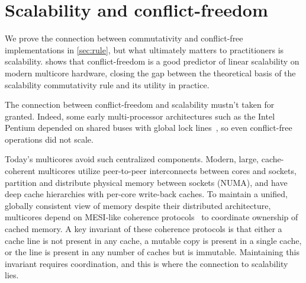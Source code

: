 \section{Scalability and conflict-freedom}
\label{sec:scalability}








We prove the connection between commutativity and conflict-free
implementations in \cref{sec:rule}, but what ultimately matters to
practitioners is scalability.   shows that
conflict-freedom is a good predictor of linear scalability on modern
multicore hardware, closing the gap between the theoretical basis of
the scalability commutativity rule and its utility in practice.

The connection between conflict-freedom and scalability mustn't taken
for granted.  Indeed, some early multi-processor architectures such as
the Intel Pentium depended on shared buses with global lock
lines~\cite[\S8.1.4]{intel-sdm-3}, so even conflict-free operations
did not scale.

Today's multicores avoid such centralized components.  Modern, large,
cache-coherent multicores utilize peer-to-peer interconnects between
cores and sockets, partition and distribute physical memory between
sockets (NUMA), and have deep cache hierarchies with per-core
write-back caches.
%
To maintain a unified, globally consistent view of memory despite
their distributed architecture, multicores depend on MESI-like
coherence protocols~\cite{papamarcos:mesi} to coordinate ownership of
cached memory.
%
A key invariant of these coherence protocols is that either a cache
line is not present in any cache, a mutable copy is present in a
single cache, or the line is present in any number of caches but is
immutable.
%
Maintaining this invariant requires coordination, and this is where
the connection to scalability lies.

